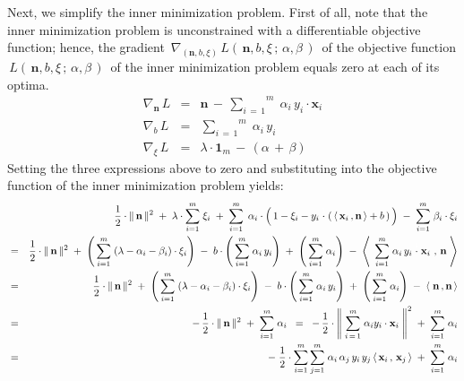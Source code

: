 Next, we simplify the inner minimization problem.
First of all, note that the inner minimization problem is unconstrained
with a differentiable objective function; hence, the gradient 
\,$\nabla_{(\mathbf{n},b,\xi)}\,L(\,\mathbf{n},b,\xi\,;\,\alpha,\beta\,)$\,
of the objective function
\,$L(\,\mathbf{n},b,\xi\,;\,\alpha,\beta\,)$\,
of the inner minimization problem equals zero at each of its optima.
\begin{eqnarray*}
\nabla_{\mathbf{n}}\,L
& = &
	\mathbf{n} \, - \, \overset{m}{\underset{i\,=\,1}{\sum}}\;\alpha_{i}\,y_{i}\cdot\mathbf{x}_{i}
\\
\nabla_{b}\,L
& = &
	\overset{m}{\underset{i\,=\,1}{\sum}}\;\alpha_{i}\,y_{i}
\\
\nabla_{\xi}\,L
& = &
	\lambda\cdot\mathbf{1}_{m} \, - \, (\alpha \, + \, \beta)
\end{eqnarray*}
Setting the three expressions above to zero and
substituting into the objective function of the inner minimization problem yields:
\begin{eqnarray*}
&&
	\dfrac{1}{2}\cdot\Vert\,\mathbf{n}\,\Vert^{2}
	\; + \;
	\lambda\cdot\overset{m}{\underset{i=1}{\sum}}\;\xi_{i}
	\; + \;
	\overset{m}{\underset{i = 1}{\sum}}\;\,
		\alpha_{i}
		\cdot
		\left(\,
			1 - \xi_{i}
			-
			y_{i}\overset{{\color{white}1}}{\cdot}\left(\,
				\langle\,\mathbf{x}_{i}\,,\mathbf{n}\,\rangle + b
				\,\right)
			\,\right)
	\; - \;
	\overset{m}{\underset{i = 1}{\sum}}\;
		\beta_{i}
		\cdot
		\xi_{i}
\\
& = &
	\dfrac{1}{2}\cdot\Vert\,\mathbf{n}\,\Vert^{2}
	\; + \;
	\left(\,\overset{m}{\underset{i=1}{\sum}}\;(\lambda-\alpha_{i}-\beta_{i})\cdot\xi_{i}\right)
	\; - \;
	b\cdot\left(\,\overset{m}{\underset{i = 1}{\sum}}\;\alpha_{i}\,y_{i}\right)
	\; + \;
	\left(\,\overset{m}{\underset{i = 1}{\sum}}\;\alpha_{i}\right)
	\; - \;
	\left\langle\;\,
		\overset{m}{\underset{i = 1}{\sum}}\;
			\alpha_{i}\,y_{i}\overset{{\color{white}1}}{\cdot}
					\mathbf{x}_{i}\,
		\,,\,
		\mathbf{n}
		\;\right\rangle
\\
& = &
	\dfrac{1}{2}\cdot\Vert\,\mathbf{n}\,\Vert^{2}
	\; + \;
	\left(\,\overset{m}{\underset{i=1}{\sum}}\;(\lambda-\alpha_{i}-\beta_{i})\cdot\xi_{i}\right)
	\; - \;
	b\cdot\left(\,\overset{m}{\underset{i = 1}{\sum}}\;\alpha_{i}\,y_{i}\right)
	\; + \;
	\left(\,\overset{m}{\underset{i = 1}{\sum}}\;\alpha_{i}\right)
	\; - \;
	\left\langle\; \mathbf{n}\,,\mathbf{n} \,\right\rangle
\\
& = &
	-\,
	\dfrac{1}{2}\cdot\Vert\,\mathbf{n}\,\Vert^{2}
	\; + \;
	\overset{m}{\underset{i = 1}{\sum}}\;\alpha_{i}
\;\; = \;\;
	-\,
	\dfrac{1}{2}\cdot\left\Vert\;
		\overset{m}{\underset{i\,=\,1}{\sum}}\;\alpha_{i}y_{i}\cdot\mathbf{x}_{i}
		\;\right\Vert^{2}
	\; + \;
	\overset{m}{\underset{i = 1}{\sum}}\;\alpha_{i}
\\
& = &
	-\;\dfrac{1}{2}\cdot
	\overset{m}{\underset{i=1}{\sum}}\,
	\overset{m}{\underset{j=1}{\sum}}\;
	\alpha_{i}\,\alpha_{j}\,y_{i}\,y_{j}\,\langle\,\mathbf{x}_{i}\,,\,\mathbf{x}_{j}\,\rangle
	\; + \;
	\overset{m}{\underset{i = 1}{\sum}}\;\alpha_{i}
\end{eqnarray*}
